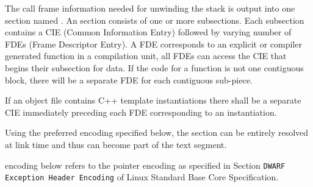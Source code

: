 The call frame information needed for unwinding the stack is output into
one section named
.  An  section consists of one or more
subsections. Each subsection contains a CIE (Common Information Entry)
followed by varying number of FDEs (Frame Descriptor Entry). A FDE
corresponds to an explicit or compiler generated function in a
compilation unit, all FDEs can access the CIE that begins their
subsection for data.  If the code for a function is not one contiguous
block, there will be a separate FDE for each contiguous sub-piece.

If an object file contains C++ template instantiations there shall be
a separate CIE immediately preceding each FDE corresponding to an
instantiation.

Using the preferred encoding specified below, the  section can
be entirely resolved at link time and thus can become part of the
text segment.

 encoding below refers to the pointer encoding as specified in
Section \texttt{DWARF Exception Header Encoding} of Linux Standard Base
Core Specification.

